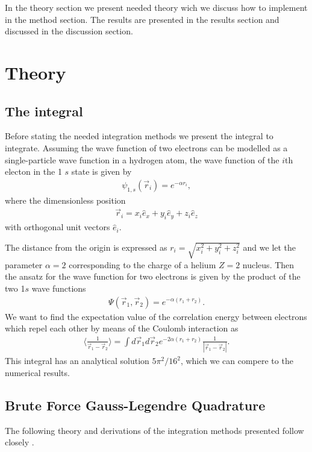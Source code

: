 \documentclass[10pt, twocolumn]{aastex62}
\begin{document}
In the theory section we present needed theory wich we discuss how to implement
in the method section. The results are presented in the results section and
discussed in the discussion section.

\section{Theory} \label{sec:theory}
\subsection{The integral}\label{subsec:integral}
Before stating the needed integration methods we present the integral to
integrate. Assuming the wave function of two electrons can be modelled as a
single-particle wave function in a hydrogen atom, the wave function of the $i$th
electon in the 1 $s$ state is given by 
\begin{align}
	\psi_{1,s}(\vec{r}_i) = e^{-\alpha r_i},
\end{align}
where the dimensionless position
\begin{align}
	\vec{r}_i = x_i \hat{e}_x + y_i\hat{e}_y + z_i\hat{e}_z
\end{align} 
with orthogonal unit vectors $\hat{e}_i$.

The distance from the origin is expressed as $r_i = \sqrt{x_i^2 + y_i^2 + z_i^2}$ and we let the parameter
$\alpha = 2$ corresponding to the charge of a helium $Z = 2$ nucleus. Then the ansatz
for the wave function for two electrons is given by the product of the two 1$s$
wave functions 
\begin{align}
	\Psi(\vec{r}_1, \vec{r}_2) = e^{-\alpha(r_1 + r_2)}.
\end{align}
We want to find the expectation value of the correlation energy between
electrons which repel each other by means of the Coulomb interaction as 
\begin{align}
\langle \frac{
1}{\vec{r}_1 - \vec{r}_2}\rangle = \int d\vec{r}_1d\vec{r}_2 e^{-2\alpha(r_1 + r_2)}\frac{1}{|\vec{r}_1 - \vec{r}_2|}.
\label{eq:integral}
\end{align}
This integral has an analytical solution $5\pi^2/16^2$, which we can compere to
the numerical results.
\subsection{Brute Force Gauss-Legendre Quadrature}\label{subsec:brute_force_gauss}
The following theory and derivations of the integration methods presented
follow closely \citep[Ch. 5.3]{jensen:2015}. 
\end{document}
